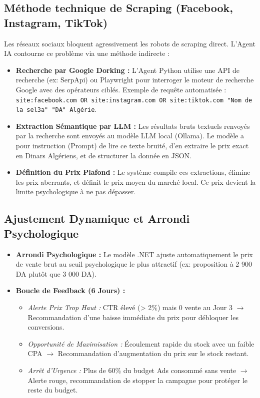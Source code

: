 \documentclass[11pt,a4paper]{article}
\begin{document}
\subsection{Méthode technique de Scraping (Facebook, Instagram, TikTok)}
Les réseaux sociaux bloquent agressivement les robots de scraping direct. L'Agent IA contourne ce problème via une méthode indirecte :
\begin{itemize}
    \item \textbf{Recherche par Google Dorking :} L'Agent Python utilise une API de recherche (ex: SerpApi) ou Playwright pour interroger le moteur de recherche Google avec des opérateurs ciblés. Exemple de requête automatisée :\\
    \texttt{site:facebook.com OR site:instagram.com OR site:tiktok.com "Nom de la sel3a" "DA" Algérie}.
    \item \textbf{Extraction Sémantique par LLM :} Les résultats bruts textuels renvoyés par la recherche sont envoyés au modèle LLM local (Ollama). Le modèle a pour instruction (Prompt) de lire ce texte bruité, d'en extraire le prix exact en Dinars Algériens, et de structurer la donnée en JSON.
    \item \textbf{Définition du Prix Plafond :} Le système compile ces extractions, élimine les prix aberrants, et définit le prix moyen du marché local. Ce prix devient la limite psychologique à ne pas dépasser.
\end{itemize}

\subsection{Ajustement Dynamique et Arrondi Psychologique}
\begin{itemize}
    \item \textbf{Arrondi Psychologique :} Le modèle .NET ajuste automatiquement le prix de vente brut au seuil psychologique le plus attractif (ex: proposition à 2 900 DA plutôt que 3 000 DA).
    \item \textbf{Boucle de Feedback (6 Jours) :}
    \begin{itemize}
        \item \textit{Alerte Prix Trop Haut :} CTR élevé (> 2\%) mais 0 vente au Jour 3 $\rightarrow$ Recommandation d'une baisse immédiate du prix pour débloquer les conversions.
        \item \textit{Opportunité de Maximisation :} Écoulement rapide du stock avec un faible CPA $\rightarrow$ Recommandation d'augmentation du prix sur le stock restant.
        \item \textit{Arrêt d'Urgence :} Plus de 60\% du budget Ads consommé sans vente $\rightarrow$ Alerte rouge, recommandation de stopper la campagne pour protéger le reste du budget.
    \end{itemize}
\end{itemize}
\end{document}
